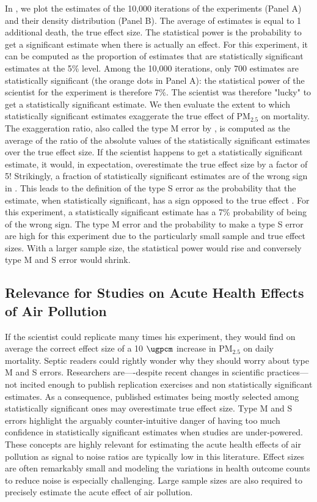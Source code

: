 \documentclass[12pt]{article}
\begin{document}
    In , we plot the estimates of the 10,000 iterations of the experiments (Panel A) and their density distribution (Panel B). The average of estimates is equal to 1 additional death, the true effect size. The statistical power is the probability to get a significant estimate when there is actually an effect. For this experiment, it can be computed as the proportion of estimates that are statistically significant estimates at the 5\% level. Among the 10,000 iterations, only 700 estimates are statistically significant (the orange dots in Panel A): the statistical power of the scientist for the experiment is therefore 7\%. The scientist was therefore "lucky" to get a statistically significant estimate. We then evaluate the extent to which statistically significant estimates exaggerate the true effect of PM$_{2.5}$ on mortality. The exaggeration ratio, also called the type M error by \cite{gelman_beyond_2014}, is computed as the average of the ratio of the absolute values of the statistically significant estimates over the true effect size. If the scientist happens to get a statistically significant estimate, it would, in expectation, overestimate the true effect size by a factor of 5! Strikingly, a fraction of statistically significant estimates are of the wrong sign in . This leads to the definition of the type S error as the probability that the estimate, when statistically significant, has a sign opposed to the true effect \citep{gelman_type_2000}. For this experiment, a statistically significant estimate has a 7\% probability of being of the wrong sign. The type M error and the probability to make a type S error are high for this experiment due to the particularly small sample and true effect sizes. With a larger sample size, the statistical power would rise and conversely type M and S error would shrink.
    
\subsection{Relevance for Studies on Acute Health Effects of Air Pollution}

    If the scientist could replicate many times his experiment, they would find on average the correct effect size of a 10 $\si{\ugpcm}$ increase in PM$_{2.5}$ on daily mortality. Septic readers could rightly wonder why they should worry about type M and S errors. Researchers are----despite recent changes in scientific practices---not incited enough to publish replication exercises and non statistically significant estimates. As a consequence, published estimates being mostly selected among statistically significant ones may overestimate true effect size. Type M and S errors highlight the arguably counter-intuitive danger of having too much confidence in statistically significant estimates when studies are under-powered. These concepts are highly relevant for estimating the acute health effects of air pollution as signal to noise ratios are typically low in this literature. Effect sizes are often remarkably small and modeling the variations in health outcome counts to reduce noise is especially challenging. Large sample sizes are also required to precisely estimate the acute effect of air pollution. 
    
\end{document}
